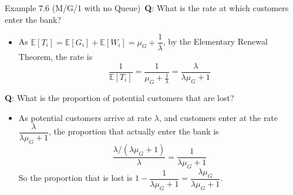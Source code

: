 \documentclass[letterpaper,handout, mathserif]{beamer}
\def\E{\mathbb E}
\begin{document}
\begin{frame}{Example 7.6 (M/G/1 with no Queue)}\,
{\bf Q}: What is the rate at which customers enter the bank?
\begin{itemize}
\item As $\E[T_i]=\E[G_i]+\E[W_i]=\mu_G+\dfrac{1}{\lambda}$, by the Elementary Renewal Theorem,
the rate is
\[
\frac{1}{\E[T_i]}=\frac{1}{\mu_G+\frac{1}{\lambda}}=\frac{\lambda}{\lambda\mu_G+1}
\]
\end{itemize}
 {\bf Q}: What is the proportion of potential customers that are lost?\small
\begin{itemize}
\item As potential customers arrive at rate $\lambda$, and customers enter at the rate $\dfrac{\lambda}{\lambda\mu_G+1}$,
the proportion that actually enter the bank is
\[
\frac{\lambda/(\lambda\mu_G+1)}{\lambda}=\frac{1}{\lambda\mu_G+1}
\]
So the proportion that is lost is $1-\dfrac{1}{\lambda\mu_G+1}=\dfrac{\lambda\mu_G}{\lambda\mu_G+1}$.
\end{itemize}
\end{frame}
\end{document}
